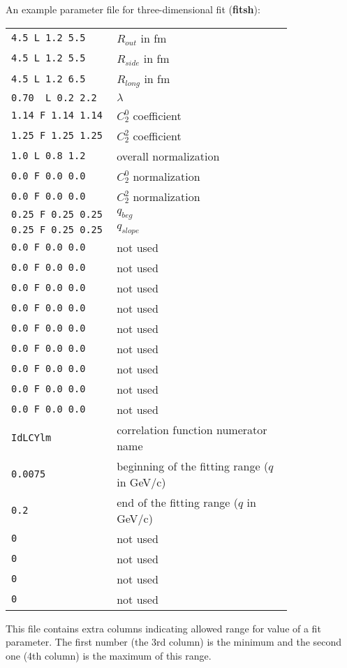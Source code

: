       An example parameter file for three-dimensional fit (\textbf{fitsh}):
      \begin{longtable}{p{0.3\linewidth}p{0.5\linewidth}}
        \verb|4.5 L 1.2 5.5|      & $R_{out}$ in fm\\
        \verb|4.5 L 1.2 5.5|      & $R_{side}$ in fm\\
        \verb|4.5 L 1.2 6.5|      & $R_{long}$ in fm\\
        \verb|0.70  L 0.2 2.2|    & $\lambda$\\
        \verb|1.14 F 1.14 1.14|   & $C_2^0$ coefficient\\
        \verb|1.25 F 1.25 1.25|   & $C_2^2$ coefficient\\
        \verb|1.0 L 0.8 1.2|      & overall normalization\\
        \verb|0.0 F 0.0 0.0|      & $C_2^0$ normalization\\
        \verb|0.0 F 0.0 0.0|      & $C_2^2$ normalization\\
        \verb|0.25 F 0.25 0.25|   & $q_{beg}$ \\
        \verb|0.25 F 0.25 0.25|   & $q_{slope}$ \\
        \verb|0.0 F 0.0 0.0|      & not used\\
        \verb|0.0 F 0.0 0.0|      & not used\\
        \verb|0.0 F 0.0 0.0|      & not used\\
        \verb|0.0 F 0.0 0.0|      & not used\\
        \verb|0.0 F 0.0 0.0|      & not used\\
        \verb|0.0 F 0.0 0.0|      & not used\\
        \verb|0.0 F 0.0 0.0|      & not used\\
        \verb|0.0 F 0.0 0.0|      & not used\\
        \verb|0.0 F 0.0 0.0|      & not used\\
        \verb|IdLCYlm|            & correlation function numerator name\\
        \verb|0.0075|             & beginning of the fitting range ($q$ in GeV/c)\\
        \verb|0.2|                & end of the fitting range ($q$ in GeV/c)\\
        \verb|0|                  & not used\\
        \verb|0|                  & not used\\
        \verb|0|                  & not used\\
        \verb|0|                  & not used\\
      \end{longtable}
      This file contains extra columns indicating allowed range for value of a fit parameter.
      The first number (the 3rd column) is the minimum and the second one (4th column) is the maximum of this range.

